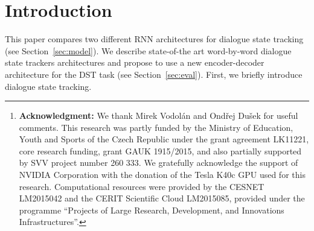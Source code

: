 \documentclass{itatnew}
\begin{document}
\begin{abstract}
This paper discusses models for dialogue state tracking using recurrent neural networks (RNN).
We present experiments on the standard dialogue state tracking (DST) dataset, DSTC2~\cite{henderson2014second}.
On the one hand, RNN models became the state of the art models in DST,
on the other hand, most state-of-the-art models are only turn-based and require dataset-specific preprocessing (e.g. DSTC2-specific) in order to achieve such results.
We implemented two architectures which can be used in incremental settings and require almost no preprocessing.
We compare their performance to the benchmarks on DSTC2 and discuss their properties.
With only trivial preprocessing, the performance of our models is close to the state-of-the-art results.\footnote{
    {\bf Acknowledgment:} We thank Mirek Vodolán and Ondřej Dušek for useful comments.
    This research was partly funded by the Ministry of Education, Youth and Sports of the Czech Republic under the grant agreement LK11221, core research funding, grant GAUK 1915/2015, and also partially supported by SVV project number 260 333. 
    We gratefully acknowledge the support of NVIDIA Corporation with the donation of the Tesla K40c GPU used for this research.
    Computational resources were provided by the CESNET LM2015042 and the CERIT Scientific Cloud LM2015085, provided under the programme ``Projects of Large Research, Development, and Innovations Infrastructures''.
    }
\end{abstract}

\section{Introduction}
 
This paper compares two different RNN architectures for dialogue state tracking (see Section~\ref{sec:model}).
We describe state-of-the art word-by-word dialogue state trackers architectures and propose to use a new encoder-decoder architecture for the DST task (see Section~\ref{sec:eval}).
First, we briefly introduce dialogue state tracking.
\end{document}
